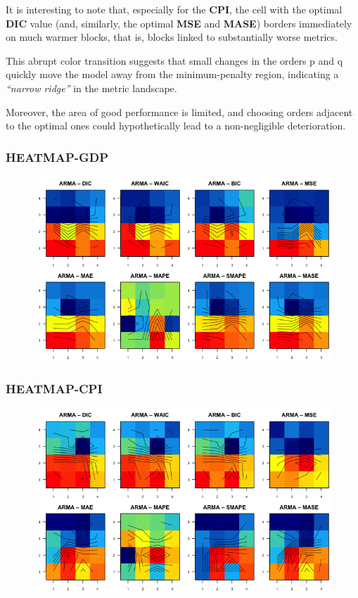 \documentclass{Configuration_Files/PoliMi3i_thesis}
\begin{document}
It is interesting to note that, especially for the \textbf{CPI}, the cell with the optimal \textbf{DIC} value (and, similarly, the optimal \textbf{MSE} and \textbf{MASE}) borders immediately on much warmer blocks, that is, blocks linked to substantially worse metrics. 

This abrupt color transition suggests that small changes in the orders p and q quickly move the model away from the minimum-penalty region, indicating a \textit{“narrow ridge”} in the metric landscape. 


Moreover, the area of good performance is limited, and choosing orders adjacent to the optimal ones could hypothetically lead to a non-negligible deterioration.


\newpage
\subsubsection{HEATMAP-GDP}
\begin{figure}[H]
    \centering
    \includegraphics[width=0.75\linewidth]{HEATMAP-CORRETTO.png}
\end{figure}
\subsubsection{HEATMAP-CPI}
\begin{figure}[H]
    \centering
    \includegraphics[width=0.75\linewidth]{HEATMAP_CPI.png}
\end{figure}
\end{document}
